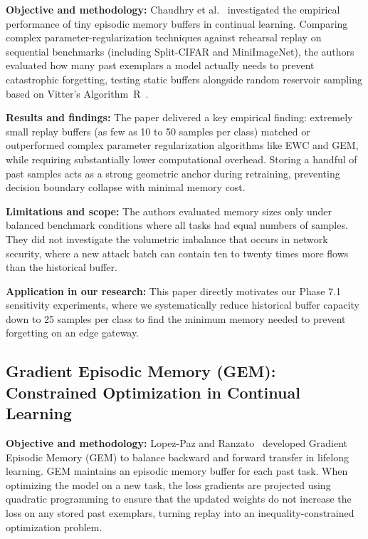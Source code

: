 \noindent\textbf{Objective and methodology:} Chaudhry et al.~\cite{chaudhry2019tiny} investigated the empirical performance of tiny episodic memory buffers in continual learning. Comparing complex parameter-regularization techniques against rehearsal replay on sequential benchmarks (including Split-CIFAR and MiniImageNet), the authors evaluated how many past exemplars a model actually needs to prevent catastrophic forgetting, testing static buffers alongside random reservoir sampling based on Vitter's Algorithm~R~\cite{vitter1985random}.

\smallskip
\noindent\textbf{Results and findings:} The paper delivered a key empirical finding: extremely small replay buffers (as few as 10 to 50 samples per class) matched or outperformed complex parameter regularization algorithms like EWC and GEM, while requiring substantially lower computational overhead. Storing a handful of past samples acts as a strong geometric anchor during retraining, preventing decision boundary collapse with minimal memory cost.

\smallskip
\noindent\textbf{Limitations and scope:} The authors evaluated memory sizes only under balanced benchmark conditions where all tasks had equal numbers of samples. They did not investigate the volumetric imbalance that occurs in network security, where a new attack batch can contain ten to twenty times more flows than the historical buffer.

\smallskip
\noindent\textbf{Application in our research:} This paper directly motivates our Phase 7.1 sensitivity experiments, where we systematically reduce historical buffer capacity down to 25 samples per class to find the minimum memory needed to prevent forgetting on an edge gateway.

\subsection{Gradient Episodic Memory (GEM): Constrained Optimization in Continual Learning}

\noindent\textbf{Objective and methodology:} Lopez-Paz and Ranzato~\cite{lopezpaz2017gem} developed Gradient Episodic Memory (GEM) to balance backward and forward transfer in lifelong learning. GEM maintains an episodic memory buffer for each past task. When optimizing the model on a new task, the loss gradients are projected using quadratic programming to ensure that the updated weights do not increase the loss on any stored past exemplars, turning replay into an inequality-constrained optimization problem.

